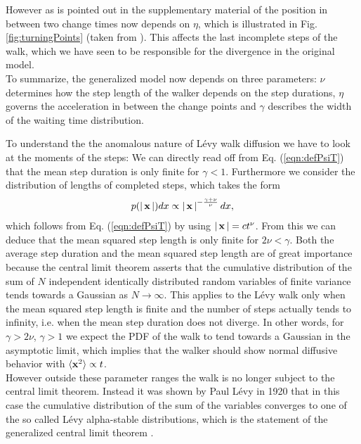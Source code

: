However as is pointed out in the supplementary material of \cite{radons2018} the position in between two change times now depends on $\eta$, which is  illustrated in Fig. \ref{fig:turningPoints} (taken from \cite{bothe}). This affects the last incomplete steps of the walk, which we have seen to be responsible for the divergence in the original model. \\
To summarize, the generalized model now depends on three parameters: $\nu$ determines how the step length of the walker depends on the step durations, $\eta$ governs the acceleration in between the change points and $\gamma$ describes the width of the waiting time distribution. \\

{\color{blue}
To understand the the anomalous nature of L\'evy walk diffusion we have to look at the moments of the steps: We can directly read off from Eq. (\ref{eqn:defPsiT}) that the mean step duration is only finite for $\gamma<1$. Furthermore we consider the distribution of lengths of completed steps, which takes the form 
%
\begin{align}
p(\left|\,\mathbf{ x }\,\right|) dx \propto \left|\,\mathbf{ x }\,\right|^{-\frac{\gamma+\nu}{\nu}} dx ,
\end{align}
%
which follows from Eq. (\ref{eqn:defPsiT}) by using $\left|\,\mathbf{ x }\,\right| = c t^{\nu}$. From this we can deduce that the mean squared step length is only finite for $2\nu < \gamma$. Both the average step duration and the mean squared step length are of great importance because the central limit theorem asserts that the cumulative distribution of the sum of $N$ independent identically distributed random variables of finite variance tends towards a Gaussian as $N \to \infty$. This applies to the L\'evy walk only when the mean squared step length is finite and the number of steps actually tends to infinity, i.e. when the mean step duration does not diverge. In other words, for $\gamma > 2 \nu$, $\gamma >1$ we expect the \gls{PDF} of the walk to tend towards a Gaussian in the asymptotic limit, which implies that the walker should show normal diffusive behavior with $\langle \mathbf{ x }^2 \rangle \propto t$. \\
However outside these parameter ranges the walk is no longer subject to the central limit theorem. Instead it was shown by Paul L\'evy in 1920 that in this case the cumulative distribution of the sum of the variables converges to one of the so called L\'evy alpha-stable distributions, which  is the statement of the generalized central limit theorem \cite{lwreview}.  

}
